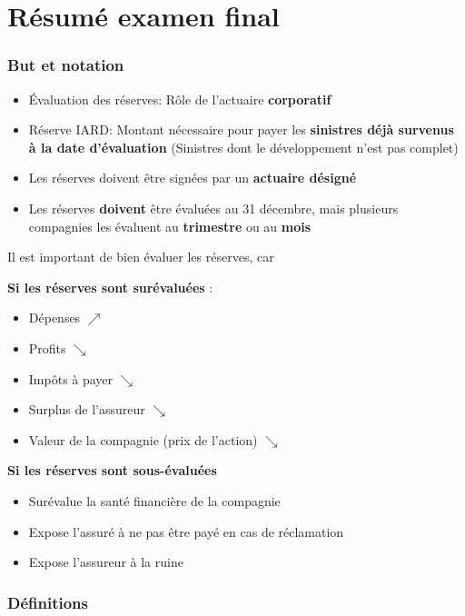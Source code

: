 \chapter{Résumé examen final}

\subsection*{But et notation} 

\begin{itemize}
\item Évaluation des réserves: Rôle de l'actuaire \textbf{corporatif}
\item Réserve IARD: Montant nécessaire pour payer les \textbf{sinistres déjà survenus à la date d'évaluation} (Sinistres dont le développement n'est pas complet)
\item Les réserves doivent être signées par un \textbf{actuaire désigné}
\item Les réserves \textbf{doivent} être évaluées au 31 décembre, mais plusieurs compagnies les évaluent au \textbf{trimestre} ou au \textbf{mois}
\end{itemize}

Il est important de bien évaluer les réserves, car

\textbf{Si les réserves sont surévaluées }:
\begin{itemize}
  \item Dépenses $\nearrow$
  \item Profits $\searrow$
  \item Impôts à payer $\searrow$
  \item Surplus de l'assureur $\searrow$
  \item Valeur de la compagnie (prix de l'action) $\searrow$
\end{itemize}


\textbf{Si les réserves sont sous-évaluées}
\begin{itemize}
  \item Surévalue la santé financière de la compagnie
  \item Expose l'assuré à ne pas être payé en cas de réclamation
  \item Expose l'assureur à la ruine
\end{itemize}


\subsection*{Définitions}

